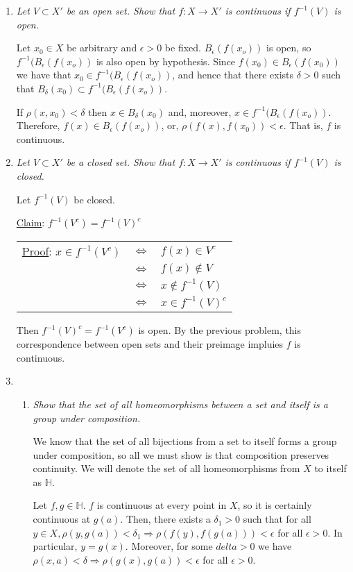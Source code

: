 \documentclass[10pt]{article}
\begin{document}
\begin{enumerate}
\item \emph{Let $V \subset X'$ be an open set.  Show that $f: X \rightarrow X'$ is continuous if $f^{-1}(V)$ is open.}

Let $x_0 \in X$ be arbitrary and $\epsilon > 0$ be fixed.  $B_\epsilon(f(x_o))$ is open, so $f^{-1}(B_\epsilon(f(x_o))$ is also open by hypothesis.  Since $f(x_0) \in B_\epsilon(f(x_0))$ we have that $x_0 \in f^{-1}(B_\epsilon(f(x_o))$, and hence that there exists $\delta > 0$ such that $B_\delta(x_0) \subset f^{-1}(B_\epsilon(f(x_o))$.

If $\rho(x,x_0) < \delta$ then $x \in B_\delta(x_0)$ and, moreover, $x \in f^{-1}(B_\epsilon(f(x_o))$.  Therefore, $f(x) \in B_\epsilon(f(x_o))$, or, $\rho(f(x),f(x_0)) < \epsilon$.  That is, $f$ is continuous.
\item \emph{Let $V \subset X'$ be a closed set.  Show that $f: X \rightarrow X'$ is continuous if $f^{-1}(V)$ is closed.}

Let $f^{-1}(V)$ be closed.  

\underline{Claim}: $f^{-1}(V^c) = f^{-1}(V)^c$

\begin{tabular}{lll}
\underline{Proof}:	$x \in f^{-1}(V^c)$ 	& $\Leftrightarrow$ & $f(x) \in V^c$\\
						& $\Leftrightarrow$ & $f(x) \notin V$\\
						& $\Leftrightarrow$ & $x \notin f^{-1}(V)$\\
						& $\Leftrightarrow$ & $x \in f^{-1}(V)^c$
\end{tabular}

Then $f^{-1}(V)^c = f^{-1}(V^c)$ is open.  By the previous problem, this correspondence between open sets and their preimage impluies $f$ is continuous.

\item
\begin{enumerate}
\item \emph{Show that the set of all homeomorphisms between a set and itself is a group under composition.}

We know that the set of all bijections from a set to itself forms a group under composition, so all we must show is that composition preserves continuity.  We will denote the set of all homeomorphisms from $X$ to itself as $\mathbb{H}$.

Let $f,g \in \mathbb{H}$.  $f$ is continuous at every point in $X$, so it is certainly continuous at $g(a)$.  Then, there exists a $\delta_1>0$ such that for all $y \in X,\rho(y,g(a))<\delta_1 \Rightarrow \rho(f(y),f(g(a)))<\epsilon$ for all $\epsilon>0$.  In particular, $y=g(x)$.  Moreover, for some $delta>0$ we have $\rho(x,a)<\delta \Rightarrow \rho(g(x),g(a))<\epsilon$ for all $\epsilon>0$.  


\end{enumerate}
\end{enumerate}
\end{document}
